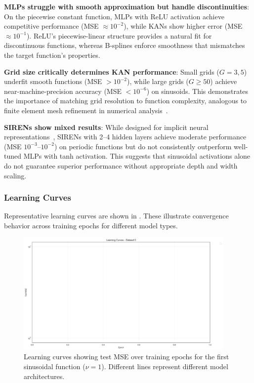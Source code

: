 \documentclass[11pt,a4paper]{article}
\begin{document}
\textbf{MLPs struggle with smooth approximation but handle discontinuities}: On the piecewise constant function, MLPs with ReLU activation achieve competitive performance (MSE $\approx 10^{-2}$), while KANs show higher error (MSE $\approx 10^{-1}$). ReLU's piecewise-linear structure provides a natural fit for discontinuous functions, whereas B-splines enforce smoothness that mismatches the target function's properties.

\textbf{Grid size critically determines KAN performance}: Small grids ($G = 3, 5$) underfit smooth functions (MSE $> 10^{-2}$), while large grids ($G \geq 50$) achieve near-machine-precision accuracy (MSE $< 10^{-6}$) on sinusoids. This demonstrates the importance of matching grid resolution to function complexity, analogous to finite element mesh refinement in numerical analysis~\citep{huang2011adaptive}.

\textbf{SIRENs show mixed results}: While designed for implicit neural representations~\citep{sitzmann2020implicit}, SIRENs with 2--4 hidden layers achieve moderate performance (MSE $10^{-3}$--$10^{-2}$) on periodic functions but do not consistently outperform well-tuned MLPs with tanh activation. This suggests that sinusoidal activations alone do not guarantee superior performance without appropriate depth and width scaling.

\subsubsection{Learning Curves}

Representative learning curves are shown in . These illustrate convergence behavior across training epochs for different model types.

\begin{figure}[htbp]
\centering
\includegraphics[width=0.95\textwidth]{../section1/analysis/section1_complete_analysis_20251021_143055/section1_1_analysis/01_comparative_metrics/dataset_0_learning_curves_test.png}
\caption{Learning curves showing test MSE over training epochs for the first sinusoidal function ($\nu=1$). Different lines represent different model architectures.}
\label{fig:s11_learning}
\end{figure}
\end{document}
